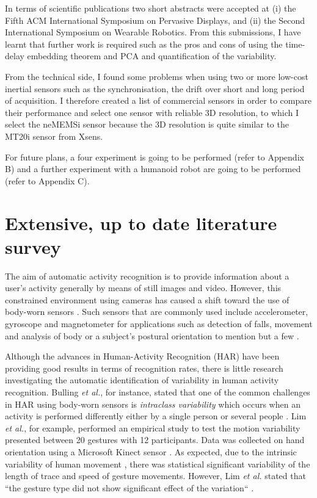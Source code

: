 \documentclass[9pt,journal,onecolumn,compsoc]{IEEEtran}
\begin{document}
In terms of scientific publications two short abstracts were accepted at
(i) the Fifth ACM International Symposium on Pervasive Displays, and 
(ii) the Second International Symposium on Wearable Robotics.
From this submissions, I have learnt that further work is 
required such as the pros and cons of using the time-delay embedding theorem and PCA
and quantification of the variability.

From the technical side, I found some problems when using two or more 
low-cost inertial sensors such as the synchronisation, the drift over short and long period of acquisition.
I therefore created a list of commercial sensors in order to compare their performance and select
one sensor with reliable 3D resolution, to which I select the neMEMSi sensor
because the 3D resolution is quite similar to the MT20i sensor from Xsens.

For future plans, a four experiment is going to be performed (refer to Appendix B)
and a further experiment with a humanoid robot are going to be performed (refer to Appendix C).


\appendices

\section{Extensive, up to date literature survey}


The aim of automatic activity recognition is to provide information about a user's activity
generally by means of still images and video. 
However, this constrained environment using cameras has caused a shift toward the use of body-worn sensors \cite{bulling2014}.
Such sensors that are commonly used include accelerometer, gyroscope and magnetometer
for applications such as detection of falls, movement and analysis of body 
or a subject's postural orientation to mention but a few \cite{Mukhopadhyay2014}.

Although the advances in Human-Activity Recognition (HAR) have been providing good results in terms of recognition rates,
there is little research investigating the automatic identification of variability in human activity recognition.
Bulling \textit{et al.}, for instance, stated that one of the common challenges in HAR 
using body-worn sensors is \textit{intraclass variability} which occurs when 
an activity is performed differently either by a single person or several people \cite{bulling2014} . 
Lim \textit{et al.}, for example, performed an empirical study to test the motion variability 
presented between 20 gestures with 12 participants. %
Data was collected on hand orientation using a Microsoft Kinect sensor \cite{Lim2012}. %
As expected, due to the intrinsic variability of human movement \cite{newell1993variability}, 
there was statistical significant variability of the length of trace and speed of gesture movements.
However, Lim \textit{et al.} stated that ``the gesture type did not show significant effect of the variation`` \cite{Lim2012}.
\end{document}
